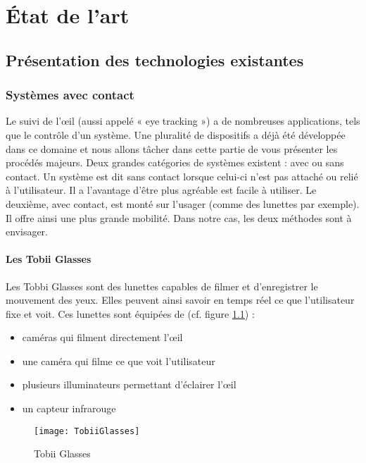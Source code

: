\chapter{État de l'art}

\section{Présentation des technologies existantes}

\subsection{Systèmes avec contact}

Le suivi de l’œil (aussi appelé « eye tracking ») a de nombreuses applications, tels que le contrôle d’un système. Une pluralité de dispositifs a déjà été développée dans ce domaine et nous allons tâcher dans cette partie de vous présenter les procédés majeurs. Deux grandes catégories de systèmes existent : avec ou sans contact. Un système est dit sans contact lorsque celui-ci n’est pas attaché ou relié à l’utilisateur. Il a l’avantage d’être plus agréable est facile à utiliser. Le deuxième, avec contact, est monté sur l’usager (comme des lunettes par exemple). Il offre ainsi une plus grande mobilité. Dans notre cas, les deux méthodes sont à envisager.

\subsubsection{Les Tobii Glasses}

Les Tobbi Glasses \cite{tobiiglasses} sont des lunettes capables de filmer et d’enregistrer le mouvement des yeux. Elles peuvent ainsi savoir en temps réel ce que l’utilisateur fixe et voit.
Ces lunettes sont équipées de (cf. figure \ref{fig:TG}) : 
\begin{itemize}[label=\textbullet,font=\color{black}]
\item caméras qui filment directement l’œil
\item une caméra qui filme ce que voit l’utilisateur
\item plusieurs illuminateurs permettant d’éclairer l’œil
\item un capteur infrarouge
\end{itemize}

\begin{figure}[h]
  \centering
  \texttt{[image: TobiiGlasses]}
  \caption{Tobii Glasses}
  \label{fig:TG}
\end{figure}

